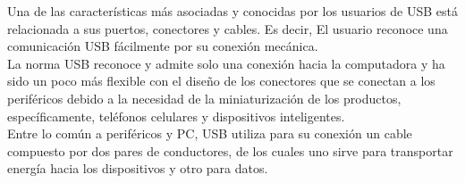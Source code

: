 Una de las características más asociadas y conocidas por los usuarios de USB está relacionada a sus puertos, conectores y cables. Es decir, El usuario reconoce una comunicación USB fácilmente por su conexión mecánica.\\

La norma USB reconoce y admite solo una conexión hacia la computadora y ha sido un poco más flexible con el diseño de los conectores que se conectan a los periféricos debido a la necesidad de la miniaturización de los productos, específicamente, teléfonos celulares y dispositivos inteligentes.\\

Entre lo común a periféricos y PC, USB utiliza para su conexión un cable compuesto por dos pares de conductores, de los cuales uno sirve para transportar energía hacia los dispositivos y otro para datos.\\

